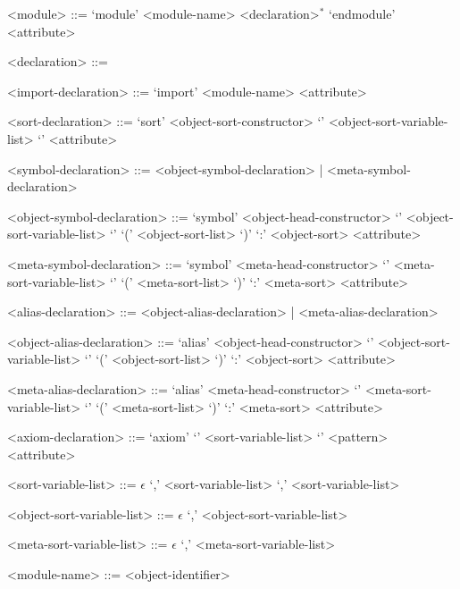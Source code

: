 \documentclass[UTF8,11pt]{article}
\theoremstyle{plain}
\theoremstyle{definition}
\theoremstyle{remark}
\begin{document}
\begin{grammar}\small

<module> ::= \quad
\alt `module' <module-name> <declaration>$^*$ 
`endmodule' <attribute>

<declaration> ::= \quad
{}

<import-declaration> ::= `import' <module-name> <attribute>

<sort-declaration> ::= `sort'
<object-sort-constructor>  `{' <object-sort-variable-list> `}' 
<attribute>

<symbol-declaration> ::= <object-symbol-declaration> | 
<meta-symbol-declaration>

<object-symbol-declaration> ::= \quad
\alt `symbol' <object-head-constructor> 
`{' <object-sort-variable-list> `}' 
`(' <object-sort-list> `)' `:' <object-sort> <attribute>

<meta-symbol-declaration> ::= \quad
\alt `symbol' <meta-head-constructor>
`{'	<meta-sort-variable-list> `}'
 `(' <meta-sort-list> `)' `:' <meta-sort> <attribute>

<alias-declaration> ::= <object-alias-declaration> | <meta-alias-declaration> 

<object-alias-declaration> ::= \quad
\alt `alias' <object-head-constructor> 
`{' <object-sort-variable-list> `}' 
`(' <object-sort-list> `)' `:' <object-sort> <attribute>

<meta-alias-declaration> ::= \quad
\alt `alias' <meta-head-constructor> 
`{'	<meta-sort-variable-list> `}'
`(' <meta-sort-list> `)' `:' <meta-sort> <attribute>

<axiom-declaration> ::= `axiom' `{' <sort-variable-list> `}' <pattern> 
<attribute>

<sort-variable-list> ::= \quad
\alt $\epsilon$
 `,' <sort-variable-list>
 `,' <sort-variable-list>

<object-sort-variable-list> ::= \quad
\alt $\epsilon$
 `,' <object-sort-variable-list>

<meta-sort-variable-list> ::= \quad
\alt $\epsilon$
 `,' <meta-sort-variable-list>

<module-name> ::= <object-identifier>
\end{grammar}
\end{document}
